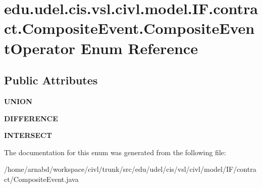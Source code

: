 \hypertarget{enumedu_1_1udel_1_1cis_1_1vsl_1_1civl_1_1model_1_1IF_1_1contract_1_1CompositeEvent_1_1CompositeEventOperator}{}\section{edu.\+udel.\+cis.\+vsl.\+civl.\+model.\+I\+F.\+contract.\+Composite\+Event.\+Composite\+Event\+Operator Enum Reference}
\label{enumedu_1_1udel_1_1cis_1_1vsl_1_1civl_1_1model_1_1IF_1_1contract_1_1CompositeEvent_1_1CompositeEventOperator}
\subsection*{Public Attributes}
\begin{DoxyCompactItemize}
\item 
\hypertarget{enumedu_1_1udel_1_1cis_1_1vsl_1_1civl_1_1model_1_1IF_1_1contract_1_1CompositeEvent_1_1CompositeEventOperator_a7efd44150af8c4831d322203c7ead57f}{}{\bfseries U\+N\+I\+O\+N}\label{enumedu_1_1udel_1_1cis_1_1vsl_1_1civl_1_1model_1_1IF_1_1contract_1_1CompositeEvent_1_1CompositeEventOperator_a7efd44150af8c4831d322203c7ead57f}

\item 
\hypertarget{enumedu_1_1udel_1_1cis_1_1vsl_1_1civl_1_1model_1_1IF_1_1contract_1_1CompositeEvent_1_1CompositeEventOperator_a7f3e1efb2eefea82013f4ca86138dd3a}{}{\bfseries D\+I\+F\+F\+E\+R\+E\+N\+C\+E}\label{enumedu_1_1udel_1_1cis_1_1vsl_1_1civl_1_1model_1_1IF_1_1contract_1_1CompositeEvent_1_1CompositeEventOperator_a7f3e1efb2eefea82013f4ca86138dd3a}

\item 
\hypertarget{enumedu_1_1udel_1_1cis_1_1vsl_1_1civl_1_1model_1_1IF_1_1contract_1_1CompositeEvent_1_1CompositeEventOperator_aae7df05a656fd9239f2b794870142f48}{}{\bfseries I\+N\+T\+E\+R\+S\+E\+C\+T}\label{enumedu_1_1udel_1_1cis_1_1vsl_1_1civl_1_1model_1_1IF_1_1contract_1_1CompositeEvent_1_1CompositeEventOperator_aae7df05a656fd9239f2b794870142f48}

\end{DoxyCompactItemize}


The documentation for this enum was generated from the following file\+:\begin{DoxyCompactItemize}
\item 
/home/arnabd/workspace/civl/trunk/src/edu/udel/cis/vsl/civl/model/\+I\+F/contract/Composite\+Event.\+java\end{DoxyCompactItemize}
